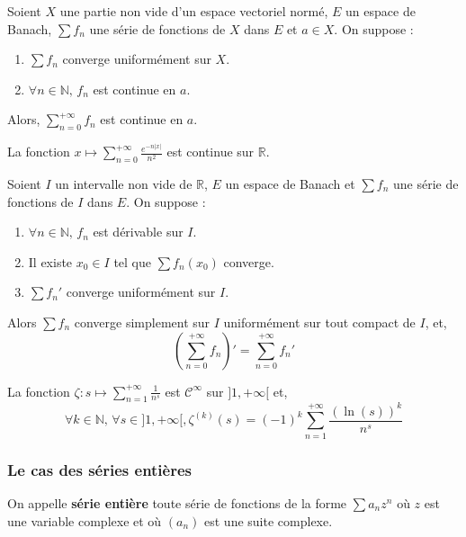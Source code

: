 	\begin{theorem}
		Soient $X$ une partie non vide d'un espace vectoriel normé, $E$ un espace de Banach, $\sum f_n$ une série de fonctions de $X$ dans $E$ et $a \in X$. On suppose :
		\begin{enumerate}[label=(\roman*)]
			\item $\sum f_n$ converge uniformément sur $X$.
			\item $\forall n \in \mathbb{N}, \, f_n$ est continue en $a$.
		\end{enumerate}
		Alors, $\sum_{n=0}^{+\infty} f_n$ est continue en $a$.
	\end{theorem}
	
	\begin{example}
		La fonction $x \mapsto \sum_{n=0}^{+\infty} \frac{e^{-n\vert x \vert}}{n^2}$ est continue sur $\mathbb{R}$. 
	\end{example}
	
	\begin{theorem}
		Soient $I$ un intervalle non vide de $\mathbb{R}$, $E$ un espace de Banach et $\sum f_n$ une série de fonctions de $I$ dans $E$. On suppose :
		\begin{enumerate}[label=(\roman*)]
			\item $\forall n \in \mathbb{N}, \, f_n$ est dérivable sur $I$.
			\item Il existe $x_0 \in I$ tel que $\sum f_n(x_0)$ converge.
			\item $\sum f_n'$ converge uniformément sur $I$.
		\end{enumerate}
		Alors $\sum f_n$ converge simplement sur $I$ uniformément sur tout compact de $I$, et,
		\[ \left( \sum_{n=0}^{+\infty} f_n \right)' = \sum_{n=0}^{+\infty} f_n' \]
	\end{theorem}
	
	\begin{example}
		La fonction $\zeta : s \mapsto \sum_{n=1}^{+\infty} \frac{1}{n^s}$ est $\mathcal{C}^\infty$ sur $]1, +\infty[$ et,
		\[ \forall k \in \mathbb{N}, \, \forall s \in ]1, +\infty[, \zeta^{(k)}(s) = (-1)^k \sum_{n=1}^{+\infty} \frac{(\ln(s))^k}{n^s} \]
	\end{example}
	
	\subsubsection{Le cas des séries entières}
	
	
	\begin{definition}
		On appelle \textbf{série entière} toute série de fonctions de la forme $\sum a_n z^n$ où $z$ est une variable complexe et où $(a_n)$ est une suite complexe.
	\end{definition}
	
